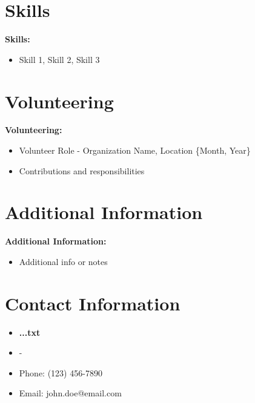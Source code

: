 \documentclass{article}
\begin{document}
{    \section{Skills}
        \vspace*{1cm}
        \textbf{Skills:}
            \begin{itemize}
                \item \indent Skill 1, Skill 2, Skill 3
            \end{itemize}
        \vspace{1cm}
        
    \section{Volunteering}
        \vspace*{1cm}
        \textbf{Volunteering:}
            \begin{itemize}
                \item \indent Volunteer Role - Organization Name, Location \alignleft\{Month, Year\}\alignright
                \item Contributions and responsibilities
            \end{itemize}
        \vspace{1cm}
        
    \section{Additional Information}
        \vspace*{1cm}
        \textbf{Additional Information:}
            \begin{itemize}
                \item \indent Additional info or notes
            \end{itemize}
        \vspace{1cm}
        
    \section{Contact Information}
        \vspace*{1cm}
        \begin{itemize}
            \item \textbf{..\textbackslashpublic\textbackslashoutput\textbackslashresume.txt}
            \item  - 
            \item Phone: (123) 456-7890
            \item Email: john.doe@email.com
        \end{itemize}

}
\end{document}
